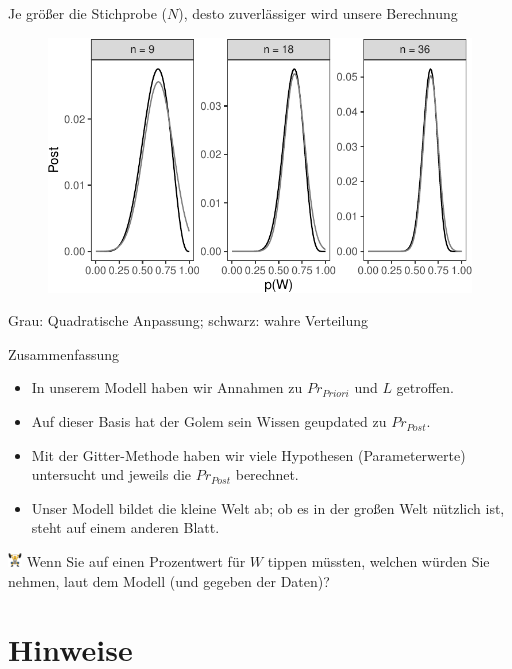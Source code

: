 \documentclass[
  ngerman,
  ignorenonframetext,
]{beamer}
\begin{document}
\begin{frame}{Je größer die Stichprobe (\(N\)), desto zuverlässiger wird
unsere Berechnung}
\protect\hypertarget{je-gruxf6uxdfer-die-stichprobe-n-desto-zuverluxe4ssiger-wird-unsere-berechnung}{}
\begin{figure}[H]
\includegraphics[width=1\linewidth]{unnamed-chunk-32-1} \end{figure}

Grau: Quadratische Anpassung; schwarz: wahre Verteilung
\end{frame}

\begin{frame}{Zusammenfassung}
\protect\hypertarget{zusammenfassung-1}{}
\begin{itemize}
\item
  In unserem Modell haben wir Annahmen zu \(Pr_{Priori}\) und \(L\)
  getroffen.
\item
  Auf dieser Basis hat der Golem sein Wissen geupdated zu \(Pr_{Post}\).
\item
  Mit der Gitter-Methode haben wir viele Hypothesen (Parameterwerte)
  untersucht und jeweils die \(Pr_{Post}\) berechnet.
\item
  Unser Modell bildet die kleine Welt ab; ob es in der großen Welt
  nützlich ist, steht auf einem anderen Blatt.
\end{itemize}

\includegraphics[width=1em]{../img/weight.pdf} Wenn Sie auf einen
Prozentwert für \(W\) tippen müssten, welchen würden Sie nehmen, laut
dem Modell (und gegeben der Daten)?
\end{frame}

\hypertarget{hinweise}{%
\section{Hinweise}\label{hinweise}}
\end{document}
